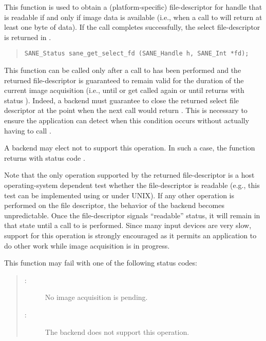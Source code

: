 \documentclass[11pt,DVIps]{report}
\begin{document}
This function is used to obtain a (platform-specific) file-descriptor
for handle  that is readable if and only if image data is
available (i.e., when a call to  will return at
least one byte of data).  If the call completes successfully, the
select file-descriptor is returned in .
\begin{quote}
\begin{verbatim}
SANE_Status sane_get_select_fd (SANE_Handle h, SANE_Int *fd);
\end{verbatim}
\end{quote}
This function can be called only after a call to 
has been performed and the returned file-descriptor is guaranteed to
remain valid for the duration of the current image acquisition (i.e.,
until  or  get called again
or until  returns with status
).  Indeed, a backend must guarantee to
close the returned select file descriptor at the point when the next
 call would return .
This is necessary to ensure the application can detect when this
condition occurs without actually having to call .

A backend may elect not to support this operation.  In such a case,
the function returns with status code
.

Note that the only operation supported by the returned file-descriptor
is a host operating-system dependent test whether the file-descriptor
is readable (e.g., this test can be implemented using 
or  under UNIX).  If any other operation is performed on
the file descriptor, the behavior of the backend becomes
unpredictable.  Once the file-descriptor signals ``readable'' status,
it will remain in that state until a call to  is
performed.  Since many input devices are very slow, support for this
operation is strongly encouraged as it permits an application to do
other work while image acquisition is in progress.

This function may fail with one of the following status codes:
\begin{quote}
\begin{description}
\item[:] No image acquisition is pending.
\item[:] The backend does not support
  this operation.
\end{description}
\end{quote}
\end{document}

